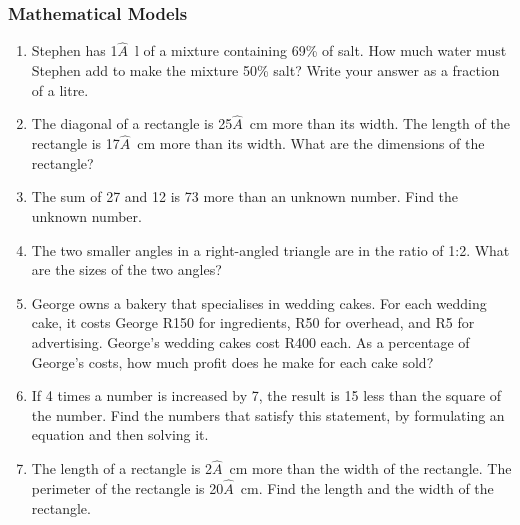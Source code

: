     \noindent
  
\label{m39262*secfhsst!!!underscore!!!id6331}
            \subsubsection{  Mathematical Models }
            \nopagebreak
            
        \label{m39262*id162712}\begin{enumerate}[noitemsep, label=\textbf{\arabic*}. ] 
            \label{m39262*uid112}\item Stephen has 1\ensuremath{\hat{A}}~l of a mixture containing 69\% of salt. How much water must Stephen add to make the mixture 50\% salt? Write your answer as a fraction of a litre.
\hspace{1ex}        
\label{m39262*uid113}\item The diagonal of a rectangle is 25\ensuremath{\hat{A}}~cm more than its width. The length of the rectangle is 17\ensuremath{\hat{A}}~cm more than its width. What are the dimensions of the rectangle?
\hspace{1ex}        
\label{m39262*uid114}\item The sum of 27 and 12 is 73 more than an unknown number. Find the unknown number.
\hspace{1ex}        
\label{m39262*uid115}\item The two smaller angles in a right-angled triangle are in the ratio of 1:2. What are the sizes of the two angles?
\hspace{1ex}        
\label{m39262*uid116}\item George owns a bakery that specialises in wedding cakes. For each wedding cake, it costs George R150 for ingredients, R50 for overhead, and R5 for advertising. George's wedding cakes cost R400 each. As a percentage of George's costs, how much profit does he make for each cake sold?
\hspace{1ex}        
\label{m39262*uid117}\item If 4 times a number is increased by 7, the result is 15 less than the square of the number. Find the numbers that satisfy this statement, by formulating an equation and then solving it.
\hspace{1ex}        
\label{m39262*uid118}\item The length of a rectangle is 2\ensuremath{\hat{A}}~cm more than the width of the rectangle. The perimeter of the rectangle is 20\ensuremath{\hat{A}}~cm. Find the length and the width of the rectangle.
\hspace{1ex}        
\end{enumerate}
        
